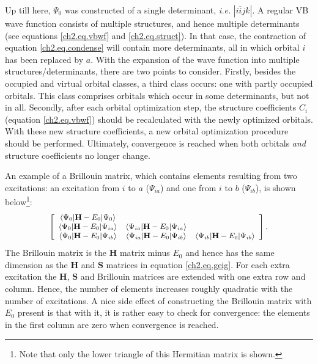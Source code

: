 Up till here, $\Psi_0$ was constructed of a single determinant, \textit{i.e.} $|i\overline{i}jk|$. A regular VB wave function consists of multiple structures, and hence multiple determinants (see equations \ref{ch2.eq.vbwf} and \ref{ch2.eq.struct}). In that case, the contraction of equation \ref{ch2.eq.condense} will contain more determinants, all in which orbital $i$ has been replaced by $a$. With the expansion of the wave function into multiple structures/determinants, there are two points to consider. Firstly, besides the occupied and virtual orbital classes, a third class occurs: one with partly occupied orbitals. This class comprises orbitals which occur in some determinants, but not in all. Secondly, after each orbital optimization step, the structure coefficients $C_i$ (equation \ref{ch2.eq.vbwf}) should be recalculated with the newly optimized orbitals. With these new structure coefficients, a new orbital optimization procedure should be performed. Ultimately, convergence is reached when both orbitals \textit{and} structure coefficients no longer change.

An example of a Brillouin matrix, which contains elements resulting from two excitations: an excitation from $i$ to $a$ ($\Psi_{ia}$) and one from $i$ to $b$ ($\Psi_{ib}$), is shown below\footnote{Note that only the lower triangle of this Hermitian matrix is shown.}:
\begin{equation}
\small
\left[\begin{array}{ccc}
\left< \Psi_{0} | \mathbf{H}-E_0 | \Psi_{0} \right> & & \\
\left< \Psi_{0} | \mathbf{H}-E_0 | \Psi_{ia} \right> & \left< \Psi_{ia} | \mathbf{H}-E_0 | \Psi_{ia} \right> &\\
\left< \Psi_{0} | \mathbf{H}-E_0 | \Psi_{ib} \right> & \left< \Psi_{ia} | \mathbf{H}-E_0 | \Psi_{ib} \right> & \left< \Psi_{ib} | \mathbf{H}-E_0 | \Psi_{ib} \right> \\
\end{array}\right].
\label{ch2.eq.hamilt}
\end{equation}
The Brillouin matrix is the $\mathbf{H}$ matrix minus $E_0$ \cite{koos1} and hence has the same dimension as the $\mathbf{H}$ and $\mathbf{S}$ matrices in equation \ref{ch2.eq.geig}. For each extra excitation the $\mathbf{H}$, $\mathbf{S}$ and Brillouin matrices are extended with one extra row and column. Hence, the number of elements increases roughly quadratic with the number of excitations. A nice side effect of constructing the Brillouin matrix with $E_0$ present is that with it, it is rather easy to check for convergence: the elements in the first column are zero when convergence is reached.

